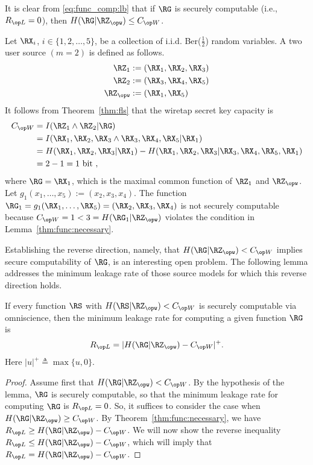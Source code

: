 { It is clear from \eqref{eq:func_comp:lb} that if $\RG$ is securely computable (i.e., $\rl=0$), then  $H(\RG|\RZ_{\opw})\leq \wskc$. 
 \begin{example}
Let $\RX_i$,  $i \in \{1,2,\ldots,5\}$, be a collection of i.i.d. Ber($\frac{1}{2}$) random variables. A two user source $(m=2)$ is defined as follows.  
\begin{align*}
    \RZ_1&:=(\RX_1,\RX_2,\RX_3)\\
    \RZ_2&:=(\RX_3,\RX_4,\RX_5)\\
    \RZ_{\opw}&:=(\RX_1, \RX_5)
\end{align*}
It follows from Theorem~\ref{thm:fls} that the wiretap secret key capacity is
\begin{align*}
    \wskc&=I(\RZ_1 \wedge \RZ_2 | \RG) \\
&= I(\RX_1,\RX_2,\RX_3 \wedge \RX_3,\RX_4,\RX_5 | \RX_1)\\
&= H(\RX_1,\RX_2,\RX_3 | \RX_1)-H(\RX_1,\RX_2,\RX_3 | \RX_3,\RX_4,\RX_5, \RX_1)\\
&= 2-1=1 \text{ bit },
\end{align*}
where $\RG=\RX_1$, which is the maximal common function of $\RZ_1$ and $\RZ_{\opw}$. Let $g_1(x_1,\ldots,x_5):=(x_2, x_3, x_4)$. The function $\RG_1=g_1(\RX_1,\ldots,\RX_5)=(\RX_2, \RX_3, \RX_4)$ is not securely computable because $\wskc=1<3=H(\RG_1|\RZ_{\opw})$ violates the condition in Lemma~\ref{thm:func:necessary}.

\end{example}

 
 Establishing the reverse direction, namely, that $H(\RG|\RZ_{\opw})< \wskc$ implies secure computability of $\RG$, is an interesting open problem. The following lemma addresses the minimum leakage rate of those source models for which this reverse direction holds. 

\begin{lemma}\label{lemma:sc}
If every function $\RS$ with $H(\RS|\RZ_{\opw}) < \wskc$ is securely computable via omniscience, then the minimum leakage rate for computing a given function $\RG$ is
     \begin{align}\label{eq:func:11}
         \rl = |H(\RG|\RZ_{\opw}) - \wskc|^{+}.
     \end{align} 
Here $|u|^{+}\triangleq \max\{u,0\}$.
\end{lemma}
\begin{proof}
    Assume first that $H(\RG|\RZ_{\opw}) < \wskc$. By the hypothesis of the lemma, $\RG$ is securely computable, so that the minimum leakage rate for computing $\RG$ is $\rl=0$. So, it suffices to consider the case when $H(\RG|\RZ_{\opw})\geq \wskc$. By Theorem~\ref{thm:func:necessary}, we have $\rl \geq H(\RG|\RZ_{\opw})- \wskc$. We will now show the reverse inequality  $\rl \leq H(\RG|\RZ_{\opw})- \wskc$, which will imply that $\rl=H(\RG|\RZ_{\opw})- \wskc$.


\end{proof}}

